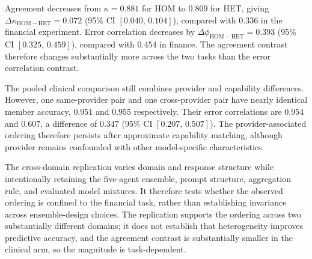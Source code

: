 \documentclass{ieeeaccess}
\begin{document}
Agreement decreases from $\kappa = 0.881$ for HOM to $0.809$ for HET, giving
$\Delta\kappa_{\mathrm{HOM-HET}} = 0.072$ (95\% CI $[0.040,\,0.104]$), compared
with $0.336$ in the financial experiment. Error correlation decreases by
$\Delta\phi_{\mathrm{HOM-HET}} = 0.393$ (95\% CI $[0.325,\,0.459]$), compared
with $0.454$ in finance. The agreement contrast therefore changes substantially
more across the two tasks than the error correlation contrast.

The pooled clinical comparison still combines provider and capability
differences. However, one same-provider pair and one cross-provider pair have
nearly identical member accuracy, $0.951$ and $0.955$ respectively. Their error
correlations are $0.954$ and $0.607$, a difference of $0.347$
(95\% CI $[0.207,\,0.507]$). The provider-associated ordering therefore persists
after approximate capability matching, although provider remains confounded with
other model-specific characteristics.

The cross-domain replication varies domain and response structure while
intentionally retaining the five-agent ensemble, prompt structure, aggregation
rule, and evaluated model mixtures. It therefore tests whether the observed
ordering is confined to the financial task, rather than establishing invariance
across ensemble-design choices. The replication supports the ordering across two
substantially different domains; it does not establish that heterogeneity
improves predictive accuracy, and the agreement contrast is substantially smaller
in the clinical arm, so the magnitude is task-dependent.
\end{document}
